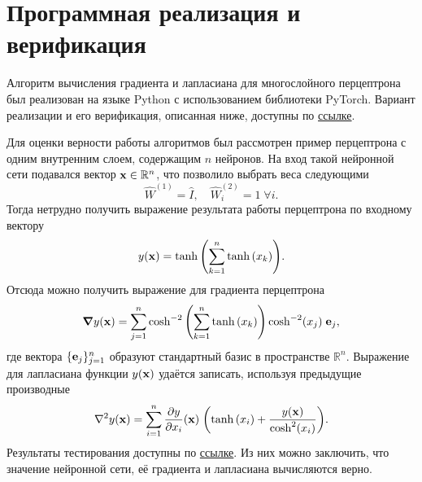 \documentclass[11pt]{article}
\begin{document}
\section{Программная реализация и верификация}

Алгоритм вычисления градиента и лапласиана для многослойного перцептрона был реализован на языке Python с использованием библиотеки PyTorch. Вариант реализации и его верификация, описанная ниже, доступны по \href{https://github.com/MrKozelberg/laplacian_perceptron/blob/main/laplacian.ipynb}{ссылке}.

Для оценки верности работы алгоритмов был рассмотрен пример перцептрона с одним внутренним слоем, содержащим $n$ нейронов. На вход такой нейронной сети подавался вектор $\vb{x}\in\mathbb{R}^n$, что позволило выбрать веса следующими
\begin{equation}
 \hat W^{(1)} = \hat I,\quad \hat W^{(2)}_i = 1\; \forall i.
\end{equation}
Тогда нетрудно получить выражение результата работы перцептрона по входному вектору
\begin{equation}
 y(\vb{x}) = \tanh\qty(\sum_{k=1}^n\tanh\qty(x_k)).
\end{equation}
Отсюда можно получить выражение для градиента перцептрона
\begin{equation}
 \grad{y} (\vb{x})= \sum_{j=1}^n \cosh^{-2}\qty(\sum_{k=1}^n\tanh\qty(x_k)) \cosh^{-2}(x_j)\; \vb{e}_j,
\end{equation}
где вектора $\{ \vb{e}_j\}_{j=1}^n$ образуют стандартный базис в пространстве $\mathbb{R}^n$. Выражение для лапласиана функции $y(\vb{x})$ удаётся записать, используя предыдущие производные
\begin{equation}
\begin{split}
 \laplacian{y} (\vb{x}) = \sum_{i=1}^n \pdv{y}{x_i} \qty(\vb{x})\; \qty(\tanh\qty(x_i) + \dfrac{y(\vb{x})}{\cosh^2(x_i)}).
\end{split}
\end{equation}
Результаты тестирования доступны по \href{https://github.com/MrKozelberg/laplacian_perceptron/blob/main/laplacian.ipynb}{ссылке}. Из них можно заключить, что значение нейронной сети, её градиента и лапласиана вычисляются верно.
\end{document}
